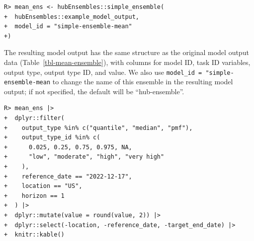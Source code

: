 \documentclass[
  article,
  shortnames,
  notitle]{jss}
\begin{document}
\begin{verbatim}
R> mean_ens <- hubEnsembles::simple_ensemble(
+  hubEnsembles::example_model_output,
+  model_id = "simple-ensemble-mean"
+)
\end{verbatim}

The resulting model output has the same structure as the original model
output data (Table~\ref{tbl-mean-ensemble}), with columns for model ID,
task ID variables, output type, output type ID, and value. We also use
\texttt{model\_id\ =\ "simple-ensemble-mean} to change the name of this
ensemble in the resulting model output; if not specified, the default
will be ``hub-ensemble''.

\begin{verbatim}
R> mean_ens |>
+  dplyr::filter(
+    output_type %in% c("quantile", "median", "pmf"),
+    output_type_id %in% c(
+      0.025, 0.25, 0.75, 0.975, NA,
+      "low", "moderate", "high", "very high"
+    ),
+    reference_date == "2022-12-17",
+    location == "US",
+    horizon == 1
+  ) |>
+  dplyr::mutate(value = round(value, 2)) |>
+  dplyr::select(-location, -reference_date, -target_end_date) |>
+  knitr::kable()
\end{verbatim}
\end{document}

